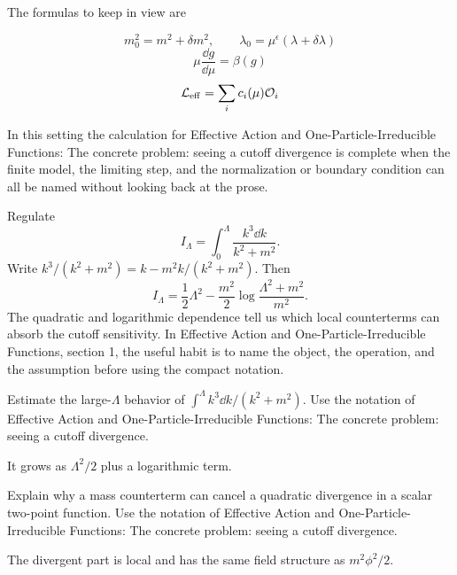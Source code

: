 The formulas to keep in view are

\[
  m_0^2=m^2+\delta m^2,\qquad \lambda_0=\mu^\epsilon(\lambda+\delta\lambda)
\]
\[
  \mu\frac{\dd g}{\dd\mu}=\beta(g)
\]
\[
  \mathcal L_{\mathrm{eff}}=\sum_i c_i(\mu)\mathcal O_i
\]

In this setting the calculation for Effective Action and One-Particle-Irreducible Functions: The concrete problem: seeing a cutoff divergence is complete when the finite model, the limiting step, and the normalization or boundary condition can all be named without looking back at the prose.




\begin{example}
Regulate
\[
  I_\Lambda=\int_0^\Lambda\frac{k^3\dd k}{k^2+m^2}.
\]
Write \(k^3/(k^2+m^2)=k-m^2k/(k^2+m^2)\).  Then
\[
  I_\Lambda=\frac12\Lambda^2-\frac{m^2}{2}\log\frac{\Lambda^2+m^2}{m^2}.
\]
The quadratic and logarithmic dependence tell us which local counterterms can absorb the cutoff sensitivity.  In Effective Action and One-Particle-Irreducible Functions, section 1, the useful habit is to name the object, the operation, and the assumption before using the compact notation.
\end{example}



\begin{exercise}
Estimate the large-\(\Lambda\) behavior of \(\int^\Lambda k^3\dd k/(k^2+m^2)\).  Use the notation of Effective Action and One-Particle-Irreducible Functions: The concrete problem: seeing a cutoff divergence.
\begin{answer}
It grows as \(\Lambda^2/2\) plus a logarithmic term.
\end{answer}
\end{exercise}

\begin{exercise}
Explain why a mass counterterm can cancel a quadratic divergence in a scalar two-point function.  Use the notation of Effective Action and One-Particle-Irreducible Functions: The concrete problem: seeing a cutoff divergence.
\begin{answer}
The divergent part is local and has the same field structure as \(m^2\phi^2/2\).
\end{answer}
\end{exercise}



